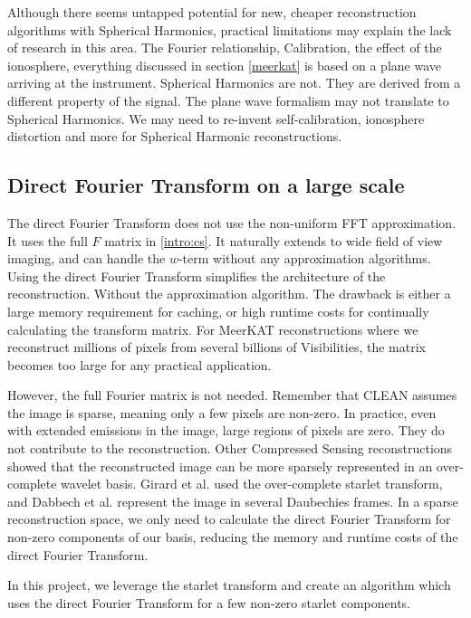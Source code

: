 Although there seems untapped potential for new, cheaper reconstruction algorithms with Spherical Harmonics, practical limitations may explain the lack of research in this area. The Fourier relationship, Calibration, the effect of the ionosphere, everything discussed in section \ref{meerkat} is based on a plane wave arriving at the instrument\cite{thompson1986interferometry, smirnov2011revisiting}. Spherical Harmonics are not. They are derived from a different property of the signal. The plane wave formalism may not translate to Spherical Harmonics. We may need to re-invent self-calibration, ionosphere distortion and more for Spherical Harmonic reconstructions.


\subsection{Direct Fourier Transform on a large scale}
The direct Fourier Transform does not use the non-uniform FFT approximation. It uses the full $F$ matrix in \eqref{intro:cs}. It naturally extends to wide field of view imaging, and can handle the $w$-term without any approximation algorithms. Using the direct Fourier Transform simplifies the architecture of the reconstruction. Without the approximation algorithm. The drawback is either a large memory requirement for caching, or high runtime costs for continually calculating the transform matrix. For MeerKAT reconstructions where we reconstruct millions of pixels from several billions of Visibilities, the matrix becomes too large for any practical application.

However, the full Fourier matrix is not needed. Remember that CLEAN assumes the image is sparse, meaning only a few pixels are non-zero. In practice, even with extended emissions in the image, large regions of pixels are zero. They do not contribute to the reconstruction. Other Compressed Sensing reconstructions showed that the reconstructed image can be more sparsely represented in an over-complete wavelet basis. Girard et al.\cite{girard2015sparse} used the over-complete starlet transform, and Dabbech et al.\cite{dabbech2018cygnus} represent the image in several Daubechies frames. In a sparse reconstruction space, we only need to calculate the direct Fourier Transform for non-zero components of our basis, reducing the memory and runtime costs of the direct Fourier Transform.

In this project, we leverage the starlet transform and create an algorithm which uses the direct Fourier Transform for a few non-zero starlet components.